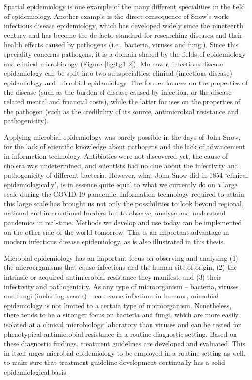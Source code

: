 \documentclass[
]{book}
\begin{document}
Spatial epidemiology is one example of the many different specialities in the field of epidemiology. Another example is the direct consequence of Snow's work: infectious disease epidemiology, which has developed widely since the nineteenth century and has become the de facto standard for researching diseases and their health effects caused by pathogens (i.e., bacteria, viruses and fungi). Since this speciality concerns pathogens, it is a domain shared by the fields of epidemiology and clinical microbiology (Figure \ref{fig:fig1-2}). Moreover, infectious disease epidemiology can be split into two subspecialties: clinical (infectious disease) epidemiology and microbial epidemiology. The former focuses on the properties of the disease (such as the burden of disease caused by infection, or the disease-related mental and financial costs), while the latter focuses on the properties of the pathogen (such as the credibility of its source, antimicrobial resistance and pathogenicity).

Applying microbial epidemiology was barely possible in the days of John Snow, for the lack of scientific knowledge about pathogens and the lack of advancement in information technology. Antibiotics were not discovered yet, the cause of cholera was undetermined, and scientists had no clue about the infectivity and pathogenicity of different bacteria. However, what John Snow did in 1854 `clinical epidemiologically', is in essence quite equal to what we currently do on a large scale during the COVID-19 pandemic. Information technology required to attain this large scale has brought us not only the possibilities to look beyond regional, national and international borders but to observe, analyse and understand pandemics in real-time. Methods we develop and use today can be implemented on the other side of the world tomorrow. This is an important advantage in modern infectious disease epidemiology, as is also illustrated in this thesis.

Microbial epidemiology has an important focus on observing and analysing (1) the microorganisms that cause infections and the human site of origin, (2) the intrinsic or acquired antimicrobial resistance they manifest, and (3) their infectivity and pathogenicity. As any type of microorganism -- bacteria, viruses and fungi (including yeasts) -- can cause infections in humans, microbial epidemiology is not limited to a certain type of microorganism. Nonetheless, there tends to be a stronger focus on bacteria and fungi, which are more easily isolated at a clinical microbiology laboratory than viruses and can be tested for phenotypical antimicrobial resistance in a routine diagnostic setting. Based on these diagnostic findings, treatment guidelines are developed and evaluated. This in itself urges microbial epidemiology to be employed in a routine setting as well, to make sure that treatment guideline development continually has a solid epidemiological basis.
\end{document}
